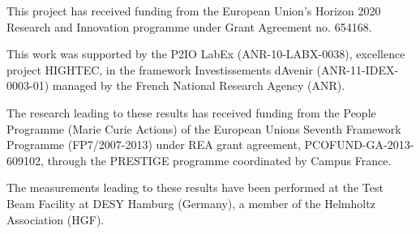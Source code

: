 \documentclass[journal]{IEEEtran}
\begin{document}
This project has received funding from the European Union’s Horizon 2020 Research and Innovation programme under Grant Agreement no. 654168.

This work was supported by the P2IO LabEx (ANR-10-LABX-0038), excellence project HIGHTEC,
in the framework {\textquotesingle}Investissements d{\textquotesingle}Avenir{\textquotesingle}
(ANR-11-IDEX-0003-01) managed by the French National Research Agency (ANR).

The research leading to these results has received funding from the People Programme (Marie
Curie Actions) of the European Union{\textquotesingle}s Seventh Framework Programme (FP7/2007-2013)
under REA grant agreement, PCOFUND-GA-2013-609102, through the PRESTIGE
programme coordinated by Campus France.

The measurements leading to these results have been performed at the Test Beam Facility at DESY Hamburg (Germany), a member of the Helmholtz Association (HGF).


\ifCLASSOPTIONcaptionsoff
  \newpage
\fi
\end{document}

